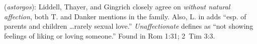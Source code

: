 \item[Unaffectionate (of family),]

(\textit{astorgos}):
Liddell, Thayer, and Gingrich closely agree on \emph{without natural affection}, both T. and Danker mentions in the family. Also, L. in  adds ``esp. of parents and children \ldots rarely sexual love.'' \emph{Unaffectionate} defines as ``not showing feelings of liking or loving someone.''
Found in Rom 1:31; 2~Tim 3:3.
